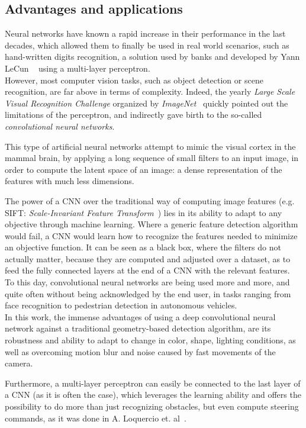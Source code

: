 \subsection{Advantages and applications}

Neural networks have known a rapid increase in their performance in the last
decades, which allowed them to finally be used in real world scenarios, such as
hand-written digits recognition, a solution used by banks and developed by Yann
LeCun \etal~\cite{41400} using a multi-layer perceptron.\\

However, most computer vision tasks, such as object detection or scene
recognition, are far above in terms of complexity. Indeed, the yearly
\emph{Large Scale Visual Recognition Challenge} organized by
\emph{ImageNet}~\cite{ILSVRC} quickly pointed out the limitations of the
perceptron, and indirectly gave birth to the so-called \emph{convolutional
neural networks}.

This type of artificial neural networks attempt to mimic the visual cortex in
the mammal brain, by applying a long sequence of small filters to an input
image, in order to compute the latent space of an image: a dense representation
of the features with much less dimensions.

The power of a CNN over the traditional way of computing image features (e.g.
SIFT: \emph{Scale-Invariant Feature Transform}~\cite{SIFT}) lies in its ability
to adapt to any objective through machine learning. Where a generic feature
detection algorithm would fail, a CNN would learn how to recognize the features
needed to minimize an objective function. It can be seen as a black box, where
the filters do not actually matter, because they are computed and adjusted over
a dataset, as to feed the fully connected layers at the end of a CNN with the
relevant features.\\

To this day, convolutional neural networks are being used more and more, and
quite often without being acknowledged by the end user, in tasks ranging from
face recognition to pedestrian detection in autonomous vehicles.\\

In this work, the immense advantages of using a deep convolutional neural network
against a traditional geometry-based detection algorithm, are its robustness and
ability to adapt to change in color, shape, lighting conditions, as well as
overcoming motion blur and noise caused by fast movements of the camera.

Furthermore, a multi-layer perceptron can easily be connected to the last layer
of a CNN (as it is often the case), which leverages the learning ability and
offers the possibility to do more than just recognizing obstacles, but even
compute steering commands, as it was done in A. Loquercio et. al~\cite{dronet}.
